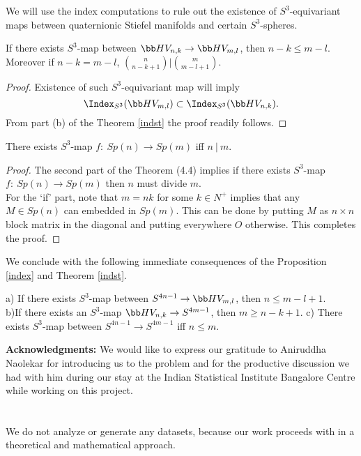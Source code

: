 We will use the index computations to rule out the existence of $S^3$-equivariant maps between quaternionic Stiefel manifolds and certain $S^3$-spheres. 
\begin{theorem}
If there exists $S^3$-map between $\bb HV_{n,k}\to \bb HV_{m,l}$,  then $n-k\leq m-l$. Moreover if $n-k=m-l$, $\binom{n}{n-k+1}\vert \binom{m}{m-l+1}$.
\end{theorem}
\begin{proof}
Existence of such $S^3$-equivariant map will imply 
\[\Index_{S^3} (\bb HV_{m,l})\subset \Index_{S^3} (\bb HV_{n,k}). \] From part (b) of the Theorem \eqref{indst} the proof readily follows. 
\end{proof}
\begin{proposition}
There exists $S^3$-map $f:~Sp(n)\to Sp(m)$ iff $n~|~m$.
\end{proposition}
\begin{proof}
The second part of the Theorem (4.4) implies if there exists $S^3$-map $f:~Sp(n)\to Sp(m)$ then $n$ must divide $m$.\\
For the `if' part, note that $m=nk$ for some $k\in N^+$  implies that any $M\in Sp(n)$ can embedded in $Sp(m)$. This can be done by putting $M$ as $n\times n$ block matrix in the diagonal and putting everywhere $O$ otherwise. This completes the proof.
\end{proof}
We conclude with the following immediate consequences of the Proposition \ref{index} and Theorem \ref{indst}. 
\begin{theorem}
a) If there exists $S^3$-map between $ S^{4n-1}\to \bb HV_{m,l}$, then $n\leq m-l+1$.\\
b)If there exists an $S^3$-map $\bb HV_{n,k}\to  S^{4m-1}$, then $m\geq n-k+1$.
c) There exists $S^3$-map between $S^{4n-1}\to S^{4m-1}$ iff $n\leq m$.
\end{theorem} 
{\bf Acknowledgments:} We would like to express our gratitude to Aniruddha Naolekar for introducing us to the problem and for the productive discussion we had with him during our stay at the Indian Statistical Institute Bangalore Centre while working on this project.
\section{}
We do not analyze or generate any datasets, because our work proceeds with in a theoretical and mathematical approach.



